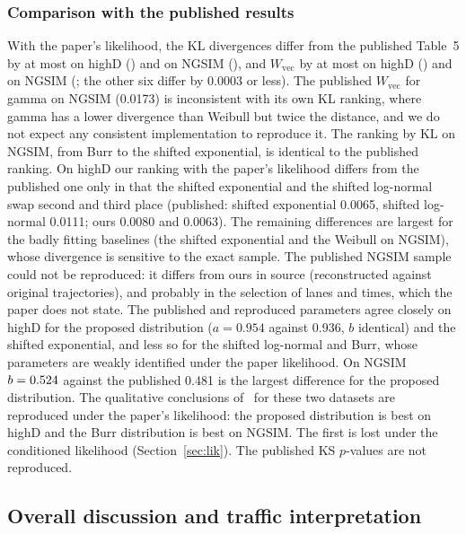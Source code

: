 \documentclass[11pt,a4paper]{article}
\numberwithin{equation}{section}
\newcommand{\Wvec}{W_{\mathrm{vec}}}
\begin{document}
\subsubsection{Comparison with the published results}\label{sec:published}
With the paper's likelihood, the KL divergences differ from the published Table~5 by at most \hdKLMaxDiffPaper{} on highD (\hdKLMaxDiffPaperName) and \ngKLMaxDiffPaper{} on NGSIM (\ngKLMaxDiffPaperName), and $\Wvec$ by at most \hdWvecMaxDiffPaper{} on highD (\hdWvecMaxDiffPaperName) and \ngWvecMaxDiffPaper{} on NGSIM (\ngWvecMaxDiffPaperName;
the other six differ by 0.0003 or less). The published $\Wvec$ for gamma on NGSIM (0.0173) is inconsistent with its own KL ranking, where gamma has a lower divergence than Weibull but twice the distance, and we do not expect any consistent implementation to reproduce it.
The ranking by KL on NGSIM, from Burr to the shifted exponential, is identical to the published ranking. On highD our ranking with the paper's likelihood differs from the published one only in that the shifted exponential and the shifted log-normal swap second and third place (published: shifted exponential 0.0065, shifted log-normal 0.0111; ours 0.0080 and 0.0063).
The remaining differences are largest for the badly fitting baselines (the shifted exponential and the Weibull on NGSIM), whose divergence is sensitive to the exact sample. The published NGSIM sample could not be reproduced: it differs from ours in source (reconstructed against original trajectories), and probably in the selection of lanes and times, which the paper does not state.
The published and reproduced parameters agree closely on highD for the proposed distribution ($a=0.954$ against 0.936, $b$ identical) and the shifted exponential, and less so for the shifted log-normal and Burr, whose parameters are weakly identified under the paper likelihood. On NGSIM $b=0.524$ against the published 0.481 is the largest difference for the proposed distribution.
The qualitative conclusions of~\cite{leungbootnak} for these two datasets are reproduced under the paper's likelihood: the proposed distribution is best on highD and the Burr distribution is best on NGSIM. The first is lost under the conditioned likelihood (Section~\ref{sec:lik}). The published KS $p$-values are not reproduced.

\subsection{Overall discussion and traffic interpretation}\label{sec:overall}
\end{document}

